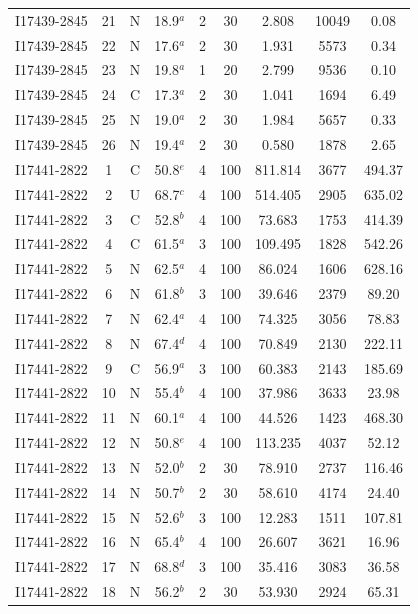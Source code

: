 \begin{table}
\begin{tabular}{ccccccccc}
I17439-2845 & 21 & N & 18.9$^{a}$ & 2 & 30 & 2.808 & 10049 & 0.08 \\
I17439-2845 & 22 & N & 17.6$^{a}$ & 2 & 30 & 1.931 & 5573 & 0.34 \\
I17439-2845 & 23 & N & 19.8$^{a}$ & 1 & 20 & 2.799 & 9536 & 0.10 \\
I17439-2845 & 24 & C & 17.3$^{a}$ & 2 & 30 & 1.041 & 1694 & 6.49 \\
I17439-2845 & 25 & N & 19.0$^{a}$ & 2 & 30 & 1.984 & 5657 & 0.33 \\
I17439-2845 & 26 & N & 19.4$^{a}$ & 2 & 30 & 0.580 & 1878 & 2.65 \\
I17441-2822 & 1 & C & 50.8$^{e}$ & 4 & 100 & 811.814 & 3677 & 494.37 \\
I17441-2822 & 2 & U & 68.7$^{c}$ & 4 & 100 & 514.405 & 2905 & 635.02 \\
I17441-2822 & 3 & C & 52.8$^{b}$ & 4 & 100 & 73.683 & 1753 & 414.39 \\
I17441-2822 & 4 & C & 61.5$^{a}$ & 3 & 100 & 109.495 & 1828 & 542.26 \\
I17441-2822 & 5 & N & 62.5$^{a}$ & 4 & 100 & 86.024 & 1606 & 628.16 \\
I17441-2822 & 6 & N & 61.8$^{b}$ & 3 & 100 & 39.646 & 2379 & 89.20 \\
I17441-2822 & 7 & N & 62.4$^{a}$ & 4 & 100 & 74.325 & 3056 & 78.83 \\
I17441-2822 & 8 & N & 67.4$^{d}$ & 4 & 100 & 70.849 & 2130 & 222.11 \\
I17441-2822 & 9 & C & 56.9$^{a}$ & 3 & 100 & 60.383 & 2143 & 185.69 \\
I17441-2822 & 10 & N & 55.4$^{b}$ & 4 & 100 & 37.986 & 3633 & 23.98 \\
I17441-2822 & 11 & N & 60.1$^{a}$ & 4 & 100 & 44.526 & 1423 & 468.30 \\
I17441-2822 & 12 & N & 50.8$^{e}$ & 4 & 100 & 113.235 & 4037 & 52.12 \\
I17441-2822 & 13 & N & 52.0$^{b}$ & 2 & 30 & 78.910 & 2737 & 116.46 \\
I17441-2822 & 14 & N & 50.7$^{b}$ & 2 & 30 & 58.610 & 4174 & 24.40 \\
I17441-2822 & 15 & N & 52.6$^{b}$ & 3 & 100 & 12.283 & 1511 & 107.81 \\
I17441-2822 & 16 & N & 65.4$^{b}$ & 4 & 100 & 26.607 & 3621 & 16.96 \\
I17441-2822 & 17 & N & 68.8$^{d}$ & 3 & 100 & 35.416 & 3083 & 36.58 \\
I17441-2822 & 18 & N & 56.2$^{b}$ & 2 & 30 & 53.930 & 2924 & 65.31 \\

\end{tabular}
\end{table}
